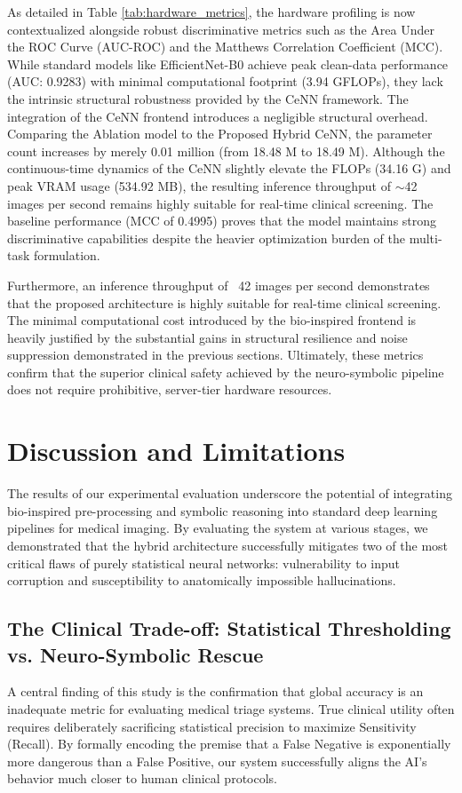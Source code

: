 \documentclass[a4paper,fleqn]{cas-dc}
\begin{document}
As detailed in Table \ref{tab:hardware_metrics}, the hardware profiling is now contextualized alongside robust discriminative metrics such as the Area Under the ROC Curve (AUC-ROC) and the Matthews Correlation Coefficient (MCC). While standard models like EfficientNet-B0 achieve peak clean-data performance (AUC: 0.9283) with minimal computational footprint (3.94 GFLOPs), they lack the intrinsic structural robustness provided by the CeNN framework. The integration of the CeNN frontend introduces a negligible structural overhead. Comparing the Ablation model to the Proposed Hybrid CeNN, the parameter count increases by merely 0.01 million (from 18.48 M to 18.49 M). Although the continuous-time dynamics of the CeNN slightly elevate the FLOPs (34.16 G) and peak VRAM usage (534.92 MB), the resulting inference throughput of $\sim$42 images per second remains highly suitable for real-time clinical screening. The baseline performance (MCC of 0.4995) proves that the model maintains strong discriminative capabilities despite the heavier optimization burden of the multi-task formulation.

Furthermore, an inference throughput of ~42 images per second demonstrates that the proposed architecture is highly suitable for real-time clinical screening. The minimal computational cost introduced by the bio-inspired frontend is heavily justified by the substantial gains in structural resilience and noise suppression demonstrated in the previous sections. Ultimately, these metrics confirm that the superior clinical safety achieved by the neuro-symbolic pipeline does not require prohibitive, server-tier hardware resources.

\section{Discussion and Limitations}
The results of our experimental evaluation underscore the potential of integrating bio-inspired pre-processing and symbolic reasoning into standard deep learning pipelines for medical imaging. By evaluating the system at various stages, we demonstrated that the hybrid architecture successfully mitigates two of the most critical flaws of purely statistical neural networks: vulnerability to input corruption and susceptibility to anatomically impossible hallucinations.

\subsection{The Clinical Trade-off: Statistical Thresholding vs. Neuro-Symbolic Rescue}
A central finding of this study is the confirmation that global accuracy is an inadequate metric for evaluating medical triage systems. True clinical utility often requires deliberately sacrificing statistical precision to maximize Sensitivity (Recall). By formally encoding the premise that a False Negative is exponentially more dangerous than a False Positive, our system successfully aligns the AI's behavior much closer to human clinical protocols.
\end{document}
